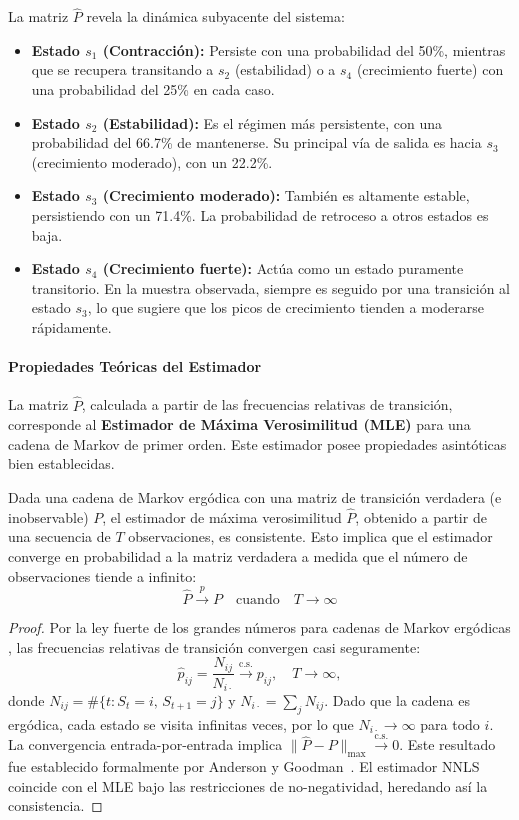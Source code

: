\begin{examplex}
La matriz \(\hat{P}\) revela la dinámica subyacente del sistema:
\begin{itemize}
    \item \textbf{Estado \(s_1\) (Contracción):} Persiste con una probabilidad del 50\%, mientras que se recupera transitando a \(s_2\) (estabilidad) o a \(s_4\) (crecimiento fuerte) con una probabilidad del 25\% en cada caso.
    \item \textbf{Estado \(s_2\) (Estabilidad):} Es el régimen más persistente, con una probabilidad del 66.7\% de mantenerse. Su principal vía de salida es hacia \(s_3\) (crecimiento moderado), con un 22.2\%.
    \item \textbf{Estado \(s_3\) (Crecimiento moderado):} También es altamente estable, persistiendo con un 71.4\%. La probabilidad de retroceso a otros estados es baja.
    \item \textbf{Estado \(s_4\) (Crecimiento fuerte):} Actúa como un estado puramente transitorio. En la muestra observada, siempre es seguido por una transición al estado \(s_3\), lo que sugiere que los picos de crecimiento tienden a moderarse rápidamente.
\end{itemize}

\paragraph{Propiedades Teóricas del Estimador}
La matriz \(\hat{P}\), calculada a partir de las frecuencias relativas de transición, corresponde al \textbf{Estimador de Máxima Verosimilitud (MLE)} para una cadena de Markov de primer orden. Este estimador posee propiedades asintóticas bien establecidas.

\begin{theorem}
\label{thm:consistencia_p_hat}
Dada una cadena de Markov ergódica con una matriz de transición verdadera (e inobservable) $P$, el estimador de máxima verosimilitud $\hat{P}$, obtenido a partir de una secuencia de $T$ observaciones, es consistente. Esto implica que el estimador converge en probabilidad a la matriz verdadera a medida que el número de observaciones tiende a infinito:
$$
\hat{P} \xrightarrow{p} P \quad \text{cuando} \quad T \to \infty
$$
\end{theorem}
\begin{proof}
Por la ley fuerte de los grandes números para cadenas de Markov
ergódicas \cite{Norris1998}, las frecuencias relativas de
transición convergen casi seguramente:
\[
\hat{p}_{ij} = \frac{N_{ij}}{N_{i\cdot}}
\xrightarrow{\text{c.s.}} p_{ij},
\quad T \to \infty,
\]
donde $N_{ij} = \#\{t : S_t = i,\, S_{t+1} = j\}$ y
$N_{i\cdot} = \sum_j N_{ij}$.  Dado que la cadena es ergódica,
cada estado se visita infinitas veces, por lo que $N_{i\cdot}
\to \infty$ para todo $i$.  La convergencia
entrada-por-entrada implica $\|\hat{P} - P\|_{\max}
\xrightarrow{\text{c.s.}} 0$.  Este resultado fue establecido
formalmente por Anderson y Goodman~\cite{AndersonGoodman1957}.
El estimador NNLS coincide con el MLE bajo las restricciones de
no-negatividad, heredando así la consistencia.
\end{proof}


\end{examplex}
